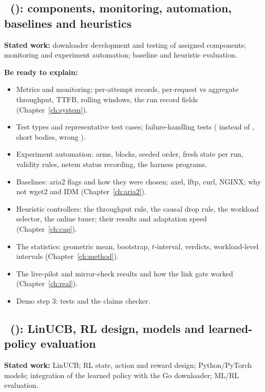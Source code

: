 \subsection{\MemberB\ (\RegB): components, monitoring, automation, baselines and heuristics}
\textbf{Stated work:} downloader development and testing of assigned components; monitoring and experiment automation; baseline and heuristic evaluation.

\textbf{Be ready to explain:}
\begin{itemize}
\item Metrics and monitoring: per-attempt records, per-request vs aggregate throughput, TTFB, rolling windows, the run record fields (Chapter~\ref{ch:system}).
\item Test types and representative test cases; failure-handling tests ( instead of , short bodies, wrong ).
\item Experiment automation: arms, blocks, seeded order, fresh state per run, validity rules, netem status recording, the harness programs.
\item Baselines: aria2 flags and how they were chosen; axel, lftp, curl, NGINX; why not wget2 and IDM (Chapter~\ref{ch:aria2}).
\item Heuristic controllers: the throughput rule, the causal drop rule, the workload selector, the online tuner; their results and adaptation speed (Chapter~\ref{ch:cap}).
\item The statistics: geometric mean, bootstrap, $t$-interval, verdicts, workload-level intervals (Chapter~\ref{ch:method}).
\item The live-pilot and mirror-check results and how the link gate worked (Chapter~\ref{ch:real}).
\item Demo step 3: tests and the claims checker.
\end{itemize}

\subsection{\MemberC\ (\RegC): LinUCB, RL design, models and learned-policy evaluation}
\textbf{Stated work:} LinUCB; RL state, action and reward design; Python/PyTorch models; integration of the learned policy with the Go downloader; ML/RL evaluation.


